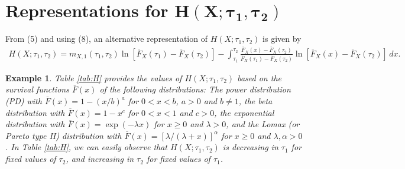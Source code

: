 \documentclass[11pt]{article}
\newtheorem{example}{Example}
\begin{document}
\section{Representations for $\boldsymbol{H(X;\tau_1,\tau_2)}$}  \label{sec3}

From (5) and using (8), an alternative representation of $H(X;\tau_1,\tau_2)$ is given by
\begin{align}
	\textstyle H(X;\tau_1,\tau_2) = m_{X,1}(\tau_1,\tau_2) \ln[\overline{F}_X(\tau_1)-\overline{F}_X(\tau_2)] \textstyle - \int_{\tau_1}^{\tau_2} \frac{\overline{F}_X(x)-\overline{F}_X(\tau_2)}{\overline{F}_X(\tau_1)-\overline{F}_X(\tau_2)} \ln[\overline{F}_X(x)-\overline{F}_X(\tau_2)] \, dx.
\end{align}

 
\begin{example}
	Table \ref{tab:H} provides the values of $H(X; \tau_1, \tau_2)$ based on the survival functions $\overline{F}(x)$ of the following distributions: The power distribution (PD) with $\overline{F}(x) = 1 - (x/b)^a$ for $0 < x < b$, $a > 0$ and $b \neq 1$, the beta distribution with $\overline{F}(x) = 1 - x^c$ for $0 < x < 1$ and $c > 0$, the exponential distribution with $\overline{F}(x) = \exp(-\lambda x)$ for $x \geq 0$ and $\lambda > 0$, and the Lomax (or Pareto type II) distribution with $\overline{F}(x) = \left[\lambda/(\lambda + x)\right]^\alpha$ for $x \geq 0$ and $\lambda, \alpha > 0$. In Table \ref{tab:H}, we can easily observe that $H(X; \tau_1, \tau_2)$ is decreasing in $\tau_1$ for fixed values of $\tau_2$, and increasing in $\tau_2$ for fixed values of $\tau_1$.


\end{example}
\end{document}
